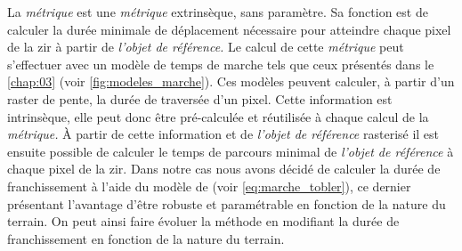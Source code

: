 La \emph{métrique}  est une \emph{métrique}
extrinsèque, sans paramètre. Sa fonction est de calculer la durée
minimale de déplacement nécessaire pour atteindre chaque pixel de la
\ac{zir} à partir de \emph{l'objet de référence.} Le calcul de cette
\emph{métrique} peut s'effectuer avec un modèle de temps de marche
tels que ceux présentés dans le \autoref{chap:03} (voir
\autoref{fig:modeles_marche}). Ces modèles peuvent calculer, à partir
d'un raster de pente, la durée de traversée d'un pixel. Cette
information est intrinsèque, elle peut donc être pré-calculée et
réutilisée à chaque calcul de la \emph{métrique.} À partir de cette
information et de \emph{l'objet de référence} rasterisé il est ensuite
possible de calculer le temps de parcours minimal de \emph{l'objet de
  référence} à chaque pixel de la \ac{zir}. Dans notre cas nous avons
décidé de calculer la durée de franchissement à l'aide du modèle de
\textcite{Tobler1993} (voir \autoref{eq:marche_tobler}), ce dernier
présentant l'avantage d'être robuste et paramétrable en fonction de la
nature du terrain. On peut ainsi faire évoluer la méthode en modifiant
la durée de franchissement en fonction de la nature du terrain.


